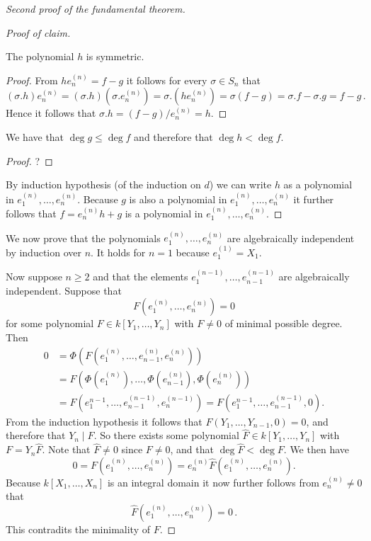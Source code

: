 \begin{proof}[Second proof of the fundamental theorem]
\begin{proof}[Proof of claim]
    \begin{claim}
      The polynomial $h$ is symmetric.
    \end{claim}
    \begin{proof}
      From $h e^{(n)}_n = f-g$ it follows for every $\sigma \in S_n$ that
      \[
          (\sigma.h) e^{(n)}_n
        = (\sigma.h) (\sigma.e^{(n)}_n)
        = \sigma.(h e^{(n)}_n)
        = \sigma(f-g)
        = \sigma.f - \sigma.g
        = f - g \,.
      \]
      Hence it follows that $\sigma.h = (f-g)/e^{(n)}_n = h$.
    \end{proof}
    
    \begin{claim}
      We have that $\deg g \leq \deg f$ and therefore that $\deg h < \deg f$.
    \end{claim}
    \begin{proof}
      ?
    \end{proof}
    
    By induction hypothesis (of the induction on $d$) we can write $h$ as a polynomial in $e^{(n)}_1, \dotsc, e^{(n)}_n$.
    Because $g$ is also a polynomial in $e^{(n)}_1, \dotsc, e^{(n)}_n$ it further follows that $f = e^{(n)}_n h + g$ is a polynomial in $e^{(n)}_1, \dotsc, e^{(n)}_n$.
  \end{proof}
  
  We now prove that the polynomials $e^{(n)}_1, \dotsc, e^{(n)}_n$ are algebraically independent by induction over $n$.
  It holds for $n = 1$ because $e^{(1)}_1 = X_1$.
  
  Now suppose $n \geq 2$ and that the elements $e^{(n-1)}_1, \dotsc, e^{(n-1)}_{n-1}$ are algebraically independent.
  Suppose that
  \[
      F\left(e^{(n)}_1, \dotsc, e^{(n)}_n\right)
    = 0
  \]
  for some polynomial $F \in k[Y_1, \dotsc, Y_n]$ with $F \neq 0$ of minimal possible degree.
  Then
  \begin{align*}
        0
    &=  \Phi \left( F \left( e^{(n)}_1, \dotsc, e^{(n)}_{n-1}, e^{(n)}_n \right) \right) \\
    &=  F \left(
            \Phi\left( e^{(n)}_1 \right),
            \dotsc,
            \Phi\left( e^{(n)}_{n-1} \right),
            \Phi\left( e^{(n)}_n \right)
          \right) \\
    &=  F \left( e^{n-1}_1, \dotsc, e^{(n-1)}_{n-1}, e^{(n-1)}_n \right)
     =  F \left( e^{n-1}_1, \dotsc, e^{(n-1)}_{n-1}, 0 \right).
  \end{align*}
  From the induction hypothesis it follows that $F(Y_1, \dotsc, Y_{n-1}, 0) = 0$, and therefore that $Y_n \mid F$.
  So there exists some polynomial $\hat{F} \in k[Y_1, \dotsc, Y_n]$ with $F = Y_n \hat{F}$.
  Note that $\hat{F} \neq 0$ since $F \neq 0$, and that $\deg \hat{F}  <\deg F$.
  We then have
  \[
      0
    = F\left( e^{(n)}_1, \dotsc, e^{(n)}_n \right)
    = e^{(n)}_n \hat{F}\left( e^{(n)}_1, \dotsc, e^{(n)}_n \right).
  \]
  Because $k[X_1, \dotsc, X_n]$ is an integral domain it now further follows from $e^{(n)}_n \neq 0$ that
  \[
      \hat{F}\left( e^{(n)}_1, \dotsc, e^{(n)}_n \right)
    = 0 \,.
  \]
  This contradits the minimality of $F$.
\end{proof}



